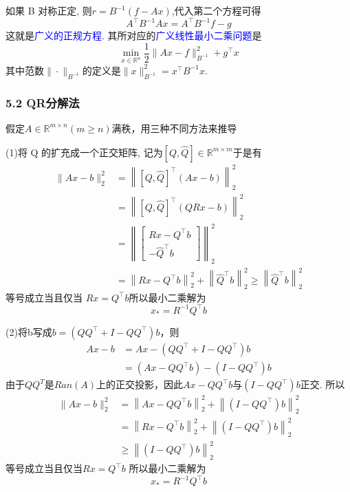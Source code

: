 \documentclass[notheorems,serif]{beamer}
\begin{document}
\begin{frame}
如果 B 对称正定, 则$r=B^{-1}(f-A x)$,代入第二个方程可得
$$
A^{\top} B^{-1} A x=A^{\top} B^{-1} f-g
$$
这就是\textcolor{blue}{广义的正规方程}. 其所对应的\textcolor{blue}{广义线性最小二乘问题}是
$$
\min _{x \in \mathbb{R}^{n}} \frac{1}{2}\|A x-f\|_{B^{-1}}^{2}+g^{\top} x
$$
其中范数$\|\cdot\|_{B^{-1}}$的定义是$\|x\|_{B^{-1}}^{2}=x^{\top} B^{-1} x$.
\end{frame}

\begin{frame}
\frametitle{5.2 QR分解法}
假定$A \in \mathbb{R}^{m \times n}(m \geq n)$满秩，用三种不同方法来推导

(1)将 Q 的扩充成一个正交矩阵, 记为$[Q, \hat{Q}] \in \mathbb{R}^{m \times m}$于是有
$$	\begin{aligned}\|A x-b\|_{2}^{2} &=\left\|[Q, \hat{Q}]^{\top}(A x-b)\right\|_{2}^{2} \\ &=\left\|[Q, \hat{Q}]^{\top}(Q R x-b)\right\|_{2}^{2} \\ &=\left\|\left[\begin{array}{c}{R x-Q^{\top} b} \\ {-\hat{Q}^{\top} b}\end{array}\right]\right\|_{2}^{2} \\ &=\left\|R x-Q^{\top} b\right\|_{2}^{2}+\left\|\hat{Q}^{\top} b\right\|_{2}^{2} \geq\left\|\hat{Q}^{\top} b\right\|_{2}^{2} \end{aligned}
$$等号成立当且仅当 $R x=Q^{\top} b$所以最小二乘解为
$$
x_{*}=R^{-1} Q^{\top} b
$$
\end{frame}

\begin{frame}
(2)将b写成$b=\left(Q Q^{\top}+I-Q Q^{\top}\right) b$，则
	$$
	\begin{aligned} A x-b &=A x-\left(Q Q^{\top}+I-Q Q^{\top}\right) b \\ &=\left(A x-Q Q^{\top} b\right)-\left(I-Q Q^{\top}\right) b \end{aligned}
	$$
	由于$QQ^{T}$是$Ran(A)$上的正交投影，因此$A x-Q Q^{\top} b$与$\left(I-Q Q^{\top}\right) b$正交. 所以
	$$
	\begin{aligned}\|A x-b\|_{2}^{2} &=\left\|A x-Q Q^{\top} b\right\|_{2}^{2}+\left\|\left(I-Q Q^{\top}\right) b\right\|_{2}^{2} \\ &=\left\|R x-Q^{\top} b\right\|_{2}^{2}+\left\|\left(I-Q Q^{\top}\right) b\right\|_{2}^{2} \\ & \geq\left\|\left(I-Q Q^{\top}\right) b\right\|_{2}^{2} \end{aligned}
	$$等号成立当且仅当$R x=Q^{\top} b$ 所以最小二乘解为
	$$
	x_{*}=R^{-1} Q^{\top} b
	$$
\end{frame}
\end{document}

